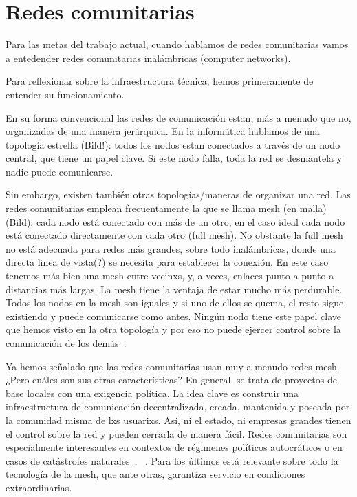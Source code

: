 \section{Redes comunitarias}

Para las metas del trabajo actual, cuando hablamos de redes comunitarias vamos a entedender redes comunitarias inalámbricas (computer networks).


Para reflexionar sobre la infraestructura técnica, hemos primeramente de entender su funcionamiento.

En su forma convencional las redes de comunicación estan, más a menudo que no, organizadas de una manera jerárquica.
En la informática hablamos de una topología estrella (Bild!): todos los nodos estan conectados a través de un nodo central,
que tiene un papel clave.
Si este nodo falla, toda la red se desmantela y nadie puede comunicarse.

Sin embargo, existen también otras topologías/maneras de organizar una red.
Las redes comunitarias emplean frecuentamente la que se llama mesh (en malla) (Bild):
cada nodo está conectado con más de un otro, en el caso ideal cada nodo está conectado directamente con cada otro (full mesh).
No obstante la full mesh no está adecuada para redes más grandes, sobre todo inalámbricas, donde una directa linea de vista(?) se necesita para establecer la conexión.
En este caso tenemos más bien una mesh entre vecinxs, y, a veces, enlaces punto a punto a distancias más largas.
La mesh tiene la ventaja de estar mucho más perdurable.
Todos los nodos en la mesh son iguales y si uno de ellos se quema, el resto sigue existiendo y puede comunicarse como antes.
Ningún nodo tiene este papel clave que hemos visto en la otra topología y por eso no puede ejercer control sobre la comunicación de los demás~\autocite{FiTre2015}.

Ya hemos señalado que las redes comunitarias usan muy a menudo redes mesh.
¿Pero cuáles son sus otras características?
En general, se trata de proyectos de base locales con una exigencia política.
La idea clave es construir una infraestructura de comunicación decentralizada, creada, mantenida y poseada por la comunidad misma de lxs usuarixs.
Así, ni el estado, ni empresas grandes tienen el control sobre la red y pueden cerrarla de manera fácil.
Redes comunitarias son especialmente interesantes en contextos de régimenes políticos autocráticos o en casos de catástrofes naturales~\autocite{Mabb2014}, ~\autocite{FiTre2015}.
Para los últimos está relevante sobre todo la tecnología de la mesh, que ante otras, garantiza servicio en condiciones extraordinarias.

